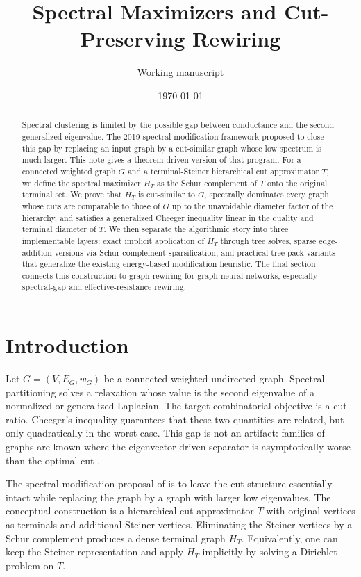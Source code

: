 \documentclass[11pt]{article}
\title{Spectral Maximizers and Cut-Preserving Rewiring}
\author{Working manuscript}
\date{\today}
\begin{document}
\maketitle

\begin{abstract}
Spectral clustering is limited by the possible gap between conductance and
the second generalized eigenvalue.  The 2019 spectral modification framework
proposed to close this gap by replacing an input graph by a cut-similar graph
whose low spectrum is much larger.  This note gives a theorem-driven version
of that program.  For a connected weighted graph $G$ and a terminal-Steiner
hierarchical cut approximator $T$, we define the spectral maximizer
$H_T$ as the Schur complement of $T$ onto the original terminal set.
We prove that $H_T$ is cut-similar to $G$, spectrally dominates every graph
whose cuts are comparable to those of $G$ up to the unavoidable diameter
factor of the hierarchy, and satisfies a generalized Cheeger inequality
linear in the quality and terminal diameter of $T$.  We then separate the
algorithmic story into three implementable layers: exact implicit application
of $H_T$ through tree solves, sparse edge-addition versions via Schur
complement sparsification, and practical tree-pack variants that generalize
the existing energy-based modification heuristic.  The final section connects
this construction to graph rewiring for graph neural networks, especially
spectral-gap and effective-resistance rewiring.
\end{abstract}

\section{Introduction}

Let $G=(V,E_G,w_G)$ be a connected weighted undirected graph.  Spectral
partitioning solves a relaxation whose value is the second eigenvalue of a
normalized or generalized Laplacian.  The target combinatorial objective is a
cut ratio.  Cheeger's inequality guarantees that these two quantities are
related, but only quadratically in the worst case.  This gap is not an artifact:
families of graphs are known where the eigenvector-driven separator is
asymptotically worse than the optimal cut \cite{guattery1998quality}.

The spectral modification proposal of \cite{koutis2019spectral} is to leave
the cut structure essentially intact while replacing the graph by a graph with
larger low eigenvalues.  The conceptual construction is a hierarchical
cut approximator $T$ with original vertices as terminals and additional
Steiner vertices.  Eliminating the Steiner vertices by a Schur complement
produces a dense terminal graph $H_T$.  Equivalently, one can keep the
Steiner representation and apply $H_T$ implicitly by solving a Dirichlet
problem on $T$.
\end{document}
